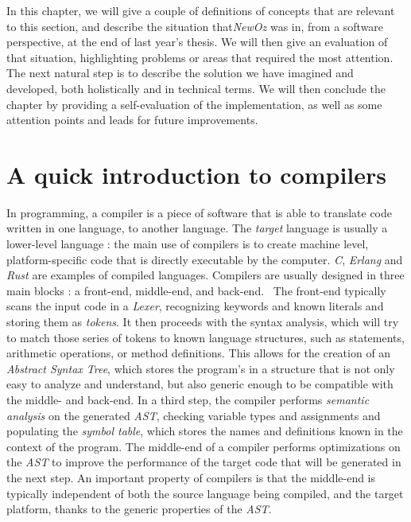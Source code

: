In this chapter, we will give a couple of definitions of concepts that are relevant to this section, and describe the situation that\textit{NewOz} was in, from a software perspective, at the end of last year's thesis.
We will then give an evaluation of that situation, highlighting problems or areas that required the most attention.
The next natural step is to describe the solution we have imagined and developed, both holistically and in technical terms.
We will then conclude the chapter by providing a self-evaluation of the implementation, as well as some attention points and leads for future improvements.

\section{A quick introduction to compilers}\label{sec:ch3-compilers}
In programming, a compiler is a piece of software that is able to translate code written in one language, to another language.
The \textit{target} language is usually a lower-level language : the main use of compilers is to create machine level, platform-specific code that is directly executable by the computer.
\textit{C}, \textit{Erlang} and \textit{Rust} are examples of compiled languages.
Compilers are usually designed in three main blocks : a front-end, middle-end, and back-end.~\cite{wikiCompiler}\newline
The front-end typically scans the input code in a \textit{Lexer}, recognizing keywords and known literals and storing them as \textit{tokens}.
It then proceeds with the syntax analysis, which will try to match those series of tokens to known language structures, such as statements, arithmetic operations, or method definitions.
This allows for the creation of an \textit{Abstract Syntax Tree}, which stores the program's in a structure that is not only easy to analyze and understand, but also generic enough to be compatible with the middle- and back-end.
In a third step, the compiler performs \textit{semantic analysis} on the generated \textit{AST}, checking variable types and assignments and populating the \textit{symbol table}, which stores the names and definitions known in the context of the program.\newline
The middle-end of a compiler performs optimizations on the \textit{AST} to improve the performance of the target code that will be generated in the next step.
An important property of compilers is that the middle-end is typically independent of both the source language being compiled, and the target platform, thanks to the generic properties of the \textit{AST}.
